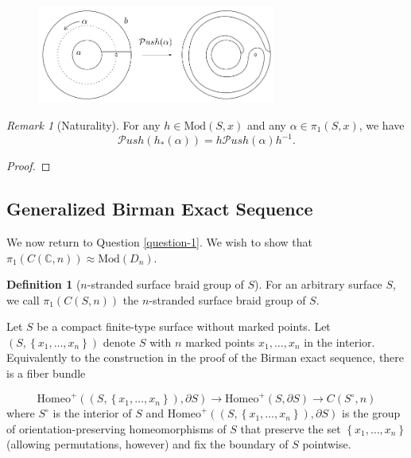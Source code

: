 \documentclass[reqno]{amsart}
\theoremstyle{definition}
\newtheorem{definition}[theorem]{Definition}
\theoremstyle{remark}
\newtheorem*{remark}{Remark}
\newcommand{\Mod}{{\mathrm{Mod}}}
\newcommand{\Homeo}{{\mathrm{Homeo}}}
\newcommand{\Push}{{\mathcal{P}}ush}
\begin{document}
 \begin{figure}[htpb]
     \centering
     \includegraphics[width=0.7\textwidth]{push-point-map.png}
     \label{fig:push-point-map-png}
 \end{figure}

 \begin{remark}[Naturality]
     For any $h \in \Mod (S,x)$ and any
     $\alpha \in \pi_1 \left( S,x \right) $, we have
     \[
     \Push \left( h_* \left( \alpha \right)  \right) 
     = h\Push \left( \alpha \right) h^{-1}.
     \] 
 \end{remark}



 \begin{proof}
 \end{proof}

 \subsection{Generalized Birman Exact Sequence}

 We now return to Question \ref{question-1}.
 We wish to show that $\pi_1 \left( C
 \left( \mathbb{C},n \right) \right) \approx
 \Mod \left( D_n \right) $. 

 \begin{definition}[$n$-stranded surface braid group of
     $S$]
     For an arbitrary surface $S$, we
     call $\pi_1 \left( C \left( S,n \right)  \right) $ 
     the $n$-stranded surface braid group of $S$.
 \end{definition}

 Let $S$ be a compact finite-type surface without marked
 points. Let $\left( S, \left\{ x_1, \ldots, x_n \right\}  \right) $ 
 denote $S$ with $n$ marked points $x_1, \ldots, x_n$ in
 the interior. Equivalently to the construction
 in the proof of the Birman exact sequence,
 there is a fiber bundle

 \[
 \Homeo^{+} \left( \left( S,
 \left\{ x_1, \ldots, x_n \right\} \right), \partial S  \right) 
 \to \Homeo^{+} \left( S, \partial S \right) 
 \to C \left( S^{\circ},n \right) 
 \]
 where $S^{\circ}$ is the interior of
 $S$ and $\Homeo^{+} \left( \left( S,
 \left\{ x_1,\ldots,x_n \right\} \right) ,\partial S \right) $ 
 is the group of orientation-preserving homeomorphisms
 of $S$ that preserve the set
 $\left\{ x_1,\ldots,x_n \right\} $ (allowing permutations,
 however) and fix the boundary of $S$ pointwise.
\end{document}
